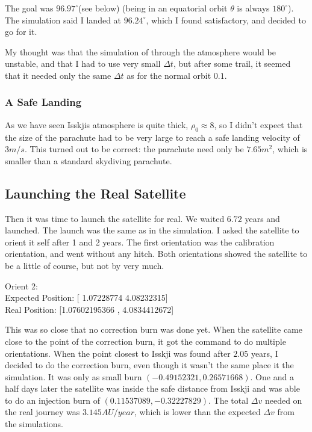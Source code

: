 \documentclass[a4paper, 10pt]{article}
\begin{document}
The goal was $96.97^\circ$(see below) (being in an equatorial orbit $\theta$ is always $180^\circ$). The simulation said I landed at $96.24^\circ$, which I found satisfactory, and decided to go for it.

My thought was that the simulation of through the atmosphere would be unstable, and that I had to use very small $\Delta t$, but after some trail, it seemed that it needed only the same $\Delta t$ as for the normal orbit $0.1$.

\subsubsection{A Safe Landing}
As we have seen Isskjis atmosphere is quite thick, $\rho_0 \approx 8$, so I didn't expect that the size of the parachute had to be very large to reach a safe landing velocity of $3m/s$. This turned out to be correct: the parachute need only be  $7.65 m^2$, which is smaller than a standard skydiving parachute.


\subsection{Launching the Real Satellite} 
Then it was time to launch the satellite for real. We waited $6.72$ years and launched. The launch was the same as in the simulation. I asked the satellite to orient it self after 1 and 2 years. The first orientation was the calibration orientation, and went without any hitch. Both orientations showed the satellite to be a little of course, but not by very much. 

\begin{tcolorbox}
Orient 2:\\
Expected Position: [ 1.07228774  4.08232315]\\
Real Position: [1.07602195366 , 4.0834412672]
\end{tcolorbox}

This was so close that no correction burn was done yet. When the satellite came close to the point of the correction burn, it got the command to do multiple orientations. When the point closest to Isskji was found after $2.05$ years, I decided to do the correction burn, even though it wasn't the same place it the simulation. It was only as small burn $(-0.49152321, 0.26571668)$. One and a half days later the satellite was inside the safe distance from Isskji and was able to do an injection burn of $(0.11537089, -0.32227829)$. The total $\Delta v$ needed on the real journey was $3.145 AU/year$, which is lower than the expected $\Delta v$ from the simulations.\\
\end{document}
